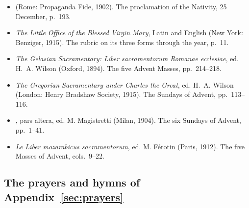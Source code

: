 \begin{itemize}[leftmargin=1.3em, itemsep=0.3em]
English, p.~213; the Matins lessons of the Sundays and Ember Days of Advent, from Isaiah, Leo the
Great, Jerome, Gregory the Great and Ambrose, pp.~214--259; the O antiphons, pp.~243--244; the
Christmas proclamation of the Martyrology, p.~269; the lessons and fourth responsory of Christmas
Matins, pp.~274--276; the antiphons of New Year's Day, p.~315. Bute prints the Office as it stood
before 1960.
\item {} (Rome: Propaganda Fide, 1902). The proclamation of the
Nativity, 25 December, p.~193.
\item \textit{The Little Office of the Blessed Virgin Mary}, Latin and English (New York:
Benziger, 1915). The rubric on its three forms through the year, p.~11.
\item \textit{The Gelasian Sacramentary: Liber sacramentorum Romanae ecclesiae}, ed. H.~A. Wilson
(Oxford, 1894). The five Advent Masses, pp.~214--218.
\item \textit{The Gregorian Sacramentary under Charles the Great}, ed. H.~A. Wilson (London:
Henry Bradshaw Society, 1915). The Sundays of Advent, pp.~113--116.
\item {}, pars altera, ed. M. Magistretti (Milan, 1904). The six Sundays
of Advent, pp.~1--41.
\item \textit{Le Liber mozarabicus sacramentorum}, ed. M. Férotin (Paris, 1912). The five Masses of
Advent, cols.~9--22.
\end{itemize}

\subsection{The prayers and hymns of Appendix~\ref{sec:prayers}}


